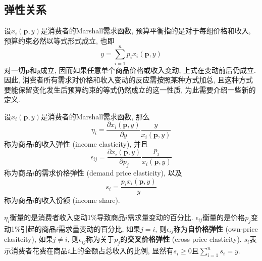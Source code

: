 \documentclass[cn, 12pt, math=mtpro2, bibstyle=apa, blue]{elegantbook}
\newcommand{\p}{\mathbf{p}}
\begin{document}
\subsection{弹性关系}
设$x_i(\p,y)$是消费者的Marshall需求函数, 预算平衡指的是对于每组价格和收入, 预算约束必然以等式形式成立, 也即
$$y=\sum_{i=1}^{n}p_ix_i(\p,y)$$
对一切$\p$和$y$成立, 因而如果任意单个商品价格或收入变动, 上式在变动前后仍成立. 因此, 消费者所有需求对价格和收入变动的反应需按照某种方式加总, 且这种方式要能保留变化发生后预算约束的等式仍然成立的这一性质, 为此需要介绍一些新的定义.

\begin{definition}
设$x_i(\p,y)$是消费者的Marshall需求函数, 那么
$$\eta_i=\frac{\partial x_i(\p,y)}{\partial y}\frac{y}{x_i(\p,y)}$$
称为商品$i$的收入弹性 (income elasticity), 并且
$$\epsilon_{ij}=\frac{\partial x_i(\p,y)}{\partial p_j}\frac{p_j}{x_i(\p,y)}$$
称为商品$i$的需求价格弹性 (demand price elasticity), 以及
$$s_i=\frac{p_ix_i(\p,y)}{y}$$
称为商品$i$的收入份额 (income share).
\end{definition}

$\eta_i$衡量的是消费者收入变动1\%导致商品$i$需求量变动的百分比. $\epsilon_{ij}$衡量的是价格$p_j$变动1\%引起的商品$i$需求量变动的百分比, 如果$j=i$, 则$\epsilon_{ij}$称为\textbf{自价格弹性} (own-price elasitcity), 如果$j\ne i$, 则$\epsilon_{ij}$称为关于$p_j$的\textbf{交叉价格弹性} (cross-price elasticity). $s_i$表示消费者花费在商品$i$上的金额占总收入的比例, 显然有$s_i\ge0$且$\sum_{i=1}^{n}s_i=y$.
\end{document}
